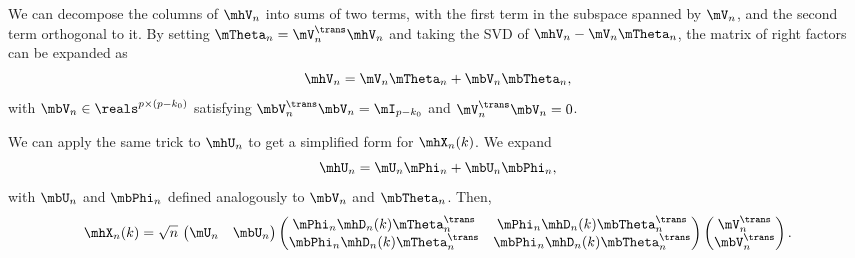 We can decompose the columns of $\mhV_n$ into sums of two terms, with the first term in the subspace spanned by $\mV_n$, and the second term orthogonal
to it.  By setting $\mTheta_n = \mV_n^\trans \mhV_n$ and 
taking the SVD of $\mhV_n - \mV_n \mTheta_n$, the matrix of right factors can 
be expanded as
\begin{equation}
    \mhV_n = \mV_n \mTheta_n + \mbV_n \mbTheta_n,
\end{equation}
with $\mbV_n \in \reals^{p \times (p-k_0)}$  satisfying
$\mbV_n^\trans \mbV_n = \mI_{p-k_0}$ and $\mV_n^\trans \mbV_n = 0$.  

We can apply the same trick to $\mhU_n$ to get a simplified form for
$\mhX_n(k)$.  We expand
\begin{equation}
    \mhU_n = \mU_n \mPhi_n + \mbU_n \mbPhi_n,
\end{equation}
with $\mbU_n$ and $\mbPhi_n$ defined analogously to $\mbV_n$ and $\mbTheta_n$.
Then,
\begin{equation}
    \mhX_n(k)
        =
        \sqrt{n} \,
        \left(
        \begin{matrix}
            \mU_n & \mbU_n
        \end{matrix}
        \right)
        \left(
        \begin{matrix}
            \mPhi_n \mhD_n(k) \mTheta_n^\trans &
                \mPhi_n \mhD_n(k) \mbTheta_n^\trans \\
            \mbPhi_n \mhD_n(k) \mTheta_n^\trans &
                \mbPhi_n \mhD_n(k) \mbTheta_n^\trans
        \end{matrix}
        \right)
        \left(
        \begin{matrix}
            \mV_n^\trans \\
            \mbV_n^\trans
        \end{matrix}
        \right).
\end{equation}

